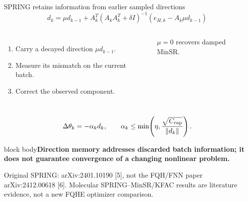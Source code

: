\documentclass[aspectratio=169,10pt]{beamer}
\newcommand{\src}[1]{\vfill{\fontsize{6.3}{7.5}\selectfont\color{muted}#1\par}}
\newcommand{\take}[1]{\vspace{1mm}\begin{beamercolorbox}[sep=1.6mm,wd=\textwidth]{block body}\small\color{teal}\textbf{#1}\end{beamercolorbox}}
\begin{document}
\begin{frame}{SPRING retains information from earlier sampled directions}
\[
\boxed{d_k=\mu d_{k-1}
+A_k^T(A_kA_k^T+\delta I)^{-1}
\left(e_{H,k}-A_k\mu d_{k-1}\right)}
\]
\begin{columns}[T,onlytextwidth]
\begin{enumerate}\setlength\itemsep{7pt}
\item Carry a decayed direction $\mu d_{k-1}$.
\item Measure its mismatch on the current batch.
\item Correct the observed component.
\end{enumerate}
\small $\mu=0$ recovers damped MinSR.
\end{columns}
\[
\Delta\theta_k=-\alpha_k d_k,\qquad
\alpha_k\leq\min\!\left(\eta,\frac{\sqrt{C_{\rm cap}}}{\|d_k\|}\right).
\]
\take{Direction memory addresses discarded batch information; it does not guarantee convergence of a changing nonlinear problem.}
\src{Original SPRING: arXiv:2401.10190 [5], not the FQH/FNN paper arXiv:2412.00618 [6]. Molecular SPRING--MinSR/KFAC results are literature evidence, not a new FQHE optimizer comparison.}
\end{frame}
\end{document}
